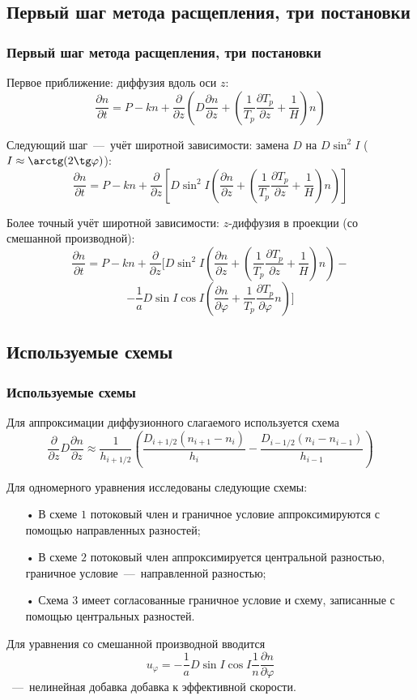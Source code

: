 \documentclass[9pt, apectratio=43,unicode]{beamer}
\begin{document}
\subsection{Первый шаг метода расщепления, три постановки}
\begin{frame}\frametitle{Первый шаг метода расщепления, три постановки}

Первое приближение: диффузия вдоль оси $z$:
$$\dfrac{\partial n}{\partial t} = P-kn+\dfrac{\partial}{\partial z}\left(D\dfrac{\partial n}{\partial z} + \left(\dfrac{1}{T_p}\dfrac{\partial T_p}{\partial z}+\dfrac{1}{H}\right) n\right)$$

Следующий шаг~---~учёт широтной зависимости: замена $D$ на $D\sin^2I$ ($I \approx \arctg(2\tg \varphi)$):
$$\dfrac{\partial n}{\partial t} =P-kn+\dfrac{\partial}{\partial z}\left[D\sin^2I\left(\dfrac{\partial n}{\partial z} + \left(\dfrac{1}{T_p}\dfrac{\partial T_p}{\partial z}+\dfrac{1}{H}\right) n\right)\right]$$

Более точный учёт широтной зависимости: $z$-диффузия в проекции (со смешанной производной):
$$\dfrac{\partial n}{\partial t} =P-kn+\dfrac{\partial}{\partial z}\biggl[D\sin^2 I\left(\dfrac{\partial n}{\partial z}+\left(\dfrac{1}{T_p}\dfrac{\partial T_p}{\partial z}+\dfrac{1}{H}\right)n\right)-$$ $$-\dfrac{1}{a}D\sin I\cos I\left(\dfrac{\partial n}{\partial\varphi}+\dfrac{1}{T_p}\dfrac{\partial T_p}{\partial\varphi}n\right)\biggr]$$ 

\end{frame}


\subsection{Используемые схемы}
\begin{frame}\frametitle{Используемые схемы}
Для аппроксимации диффузионного слагаемого используется схема $$\dfrac{\partial}{\partial z}D\dfrac{\partial n}{\partial z} \approx \dfrac{1}{h_{i+1/2}}\left(\dfrac{D_{i+1/2}(n_{i+1}-n_i)}{h_i}-\dfrac{D_{i-1/2}(n_{i}-n_{i-1})}{h_{i-1}}\right)$$

Для одномерного уравнения исследованы следующие схемы:

\begin{itemize}
\item[•] В схеме $1$ потоковый член и граничное условие аппроксимируются с помощью направленных разностей; 
\item[•] В схеме $2$ потоковый член аппроксимируется центральной разностью, граничное условие~---~направленной разностью;
\item[•] Схема $3$ имеет согласованные граничное условие и схему, записанные с помощью центральных разностей.
\end{itemize}

Для уравнения со смешанной производной вводится $$u_\varphi=-\dfrac{1}{a}D\sin I \cos I\dfrac{1}{n}\dfrac{\partial n}{\partial \varphi}$$~---~нелинейная добавка добавка к эффективной скорости.

\end{frame}
\end{document}
